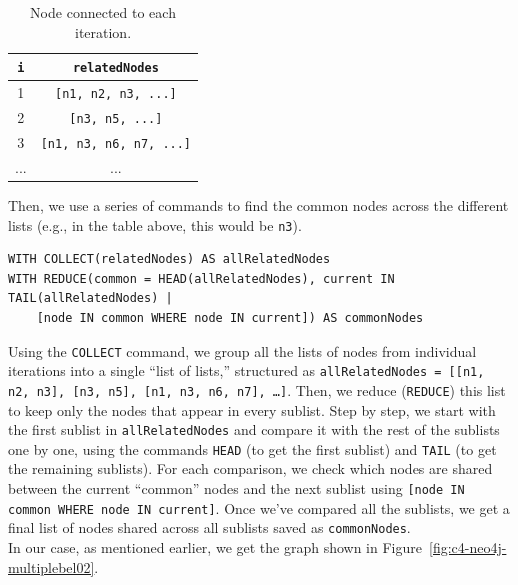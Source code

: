 \begin{table}[!h]
    \centering
    \begin{tabular}{|c|c|}
    \hline
        \textbf{\texttt{i}}  & \textbf{\texttt{relatedNodes}} \\ \hline
         1          & \texttt{[n1, n2, n3, ...]} \\ \hline
         2          & \texttt{[n3, n5, ...]} \\ \hline
         3          & \texttt{[n1, n3, n6, n7, ...]} \\ \hline
         ...          & ... \\ \hline
    \end{tabular}
    \caption{Node connected to each iteration.}
    \label{tab:c4-neo4jtable01}
\end{table}
Then, we use a series of commands to find the common nodes across the different lists (e.g., in the table above, this would be \texttt{n3}).
\begin{lstlisting}[style=cypher]
WITH COLLECT(relatedNodes) AS allRelatedNodes
WITH REDUCE(common = HEAD(allRelatedNodes), current IN TAIL(allRelatedNodes) |
    [node IN common WHERE node IN current]) AS commonNodes
\end{lstlisting}
Using the \texttt{COLLECT} command, we group all the lists of nodes from individual iterations into a single ``list of lists,'' structured as \texttt{allRelatedNodes = [[n1, n2, n3], [n3, n5], [n1, n3, n6, n7], …]}. Then, we reduce (\texttt{REDUCE}) this list to keep only the nodes that appear in every sublist. Step by step, we start with the first sublist in \texttt{allRelatedNodes} and compare it with the rest of the sublists one by one, using the commands \texttt{HEAD} (to get the first sublist) and \texttt{TAIL} (to get the remaining sublists). For each comparison, we check which nodes are shared between the current ``common'' nodes and the next sublist using \texttt{[node IN common WHERE node IN current]}. Once we’ve compared all the sublists, we get a final list of nodes shared across all sublists saved as \texttt{commonNodes}.\\
In our case, as mentioned earlier, we get the graph shown in Figure~\ref{fig:c4-neo4j-multiplebel02}.

